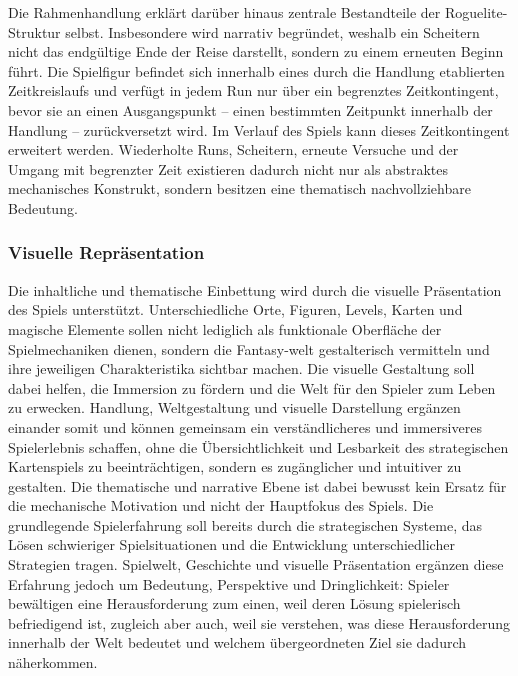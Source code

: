 Die Rahmenhandlung erklärt darüber hinaus zentrale Bestandteile der Roguelite-Struktur selbst.
Insbesondere wird narrativ begründet, weshalb ein Scheitern nicht das endgültige Ende der Reise darstellt, sondern zu einem erneuten Beginn führt.
Die Spielfigur befindet sich innerhalb eines durch die Handlung etablierten Zeitkreislaufs und verfügt in jedem Run nur über ein begrenztes Zeitkontingent, bevor sie an einen Ausgangspunkt -- einen bestimmten Zeitpunkt innerhalb der Handlung -- zurückversetzt wird.
Im Verlauf des Spiels kann dieses Zeitkontingent erweitert werden.
Wiederholte Runs, Scheitern, erneute Versuche und der Umgang mit begrenzter Zeit existieren dadurch nicht nur als abstraktes mechanisches Konstrukt, sondern besitzen eine thematisch nachvollziehbare Bedeutung.

\subsubsection{Visuelle Repräsentation}
Die inhaltliche und thematische Einbettung wird durch die visuelle Präsentation des Spiels unterstützt. Unterschiedliche Orte, Figuren, Levels, Karten und magische Elemente sollen nicht lediglich als funktionale Oberfläche der Spielmechaniken dienen, sondern die Fantasy-welt gestalterisch vermitteln und ihre jeweiligen Charakteristika sichtbar machen. Die visuelle Gestaltung soll dabei helfen, die Immersion zu fördern und die Welt für den Spieler zum Leben zu erwecken.
Handlung, Weltgestaltung und visuelle Darstellung ergänzen einander somit und können gemeinsam ein verständlicheres und immersiveres Spielerlebnis schaffen, ohne die Übersichtlichkeit und Lesbarkeit des strategischen Kartenspiels zu beeinträchtigen, sondern es zugänglicher und intuitiver zu gestalten.
Die thematische und narrative Ebene ist dabei bewusst kein Ersatz für die mechanische Motivation und nicht der Hauptfokus des Spiels.
Die grundlegende Spielerfahrung soll bereits durch die strategischen Systeme, das Lösen schwieriger Spielsituationen und die Entwicklung unterschiedlicher Strategien tragen.
Spielwelt, Geschichte und visuelle Präsentation ergänzen diese Erfahrung jedoch um Bedeutung, Perspektive und Dringlichkeit: Spieler bewältigen eine Herausforderung zum einen, weil deren Lösung spielerisch befriedigend ist, zugleich aber auch, weil sie verstehen, was diese Herausforderung innerhalb der Welt bedeutet und welchem übergeordneten Ziel sie dadurch näherkommen.

